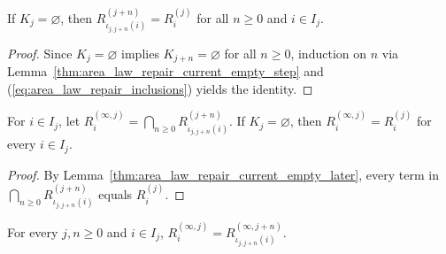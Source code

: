 \begin{lemma}
    \label{thm:area_law_repair_current_empty_later}
    \leanok
    If $K_j=\varnothing$, then $R_{\iota_{j,j+n}(i)}^{(j+n)}=R_i^{(j)}$ for all $n\ge0$ and $i\in I_j$.
\end{lemma}

\begin{proof}\leanok
    Since $K_j=\varnothing$ implies $K_{j+n}=\varnothing$ for all $n\ge0$, induction on $n$ via
    Lemma~\ref{thm:area_law_repair_current_empty_step} and (\ref{eq:area_law_repair_inclusions})
    yields the identity.
\end{proof}

\begin{lemma}
    \label{thm:area_law_repair_final_current_empty}
    \leanok
    For $i\in I_j$, let $R_i^{(\infty,j)}=\bigcap_{n\ge0}R_{\iota_{j,j+n}(i)}^{(j+n)}$.
    If $K_j=\varnothing$, then $R_i^{(\infty,j)}=R_i^{(j)}$ for every $i\in I_j$.
\end{lemma}

\begin{proof}\leanok
    By Lemma~\ref{thm:area_law_repair_current_empty_later}, every term in
    $\bigcap_{n\ge0}R_{\iota_{j,j+n}(i)}^{(j+n)}$ equals $R_i^{(j)}$.
\end{proof}

\begin{lemma}
    \label{thm:area_law_repair_final_retention}
    \leanok
    For every $j,n\ge0$ and $i\in I_j$, $R_i^{(\infty,j)}=R_{\iota_{j,j+n}(i)}^{(\infty,j+n)}$.
\end{lemma}

